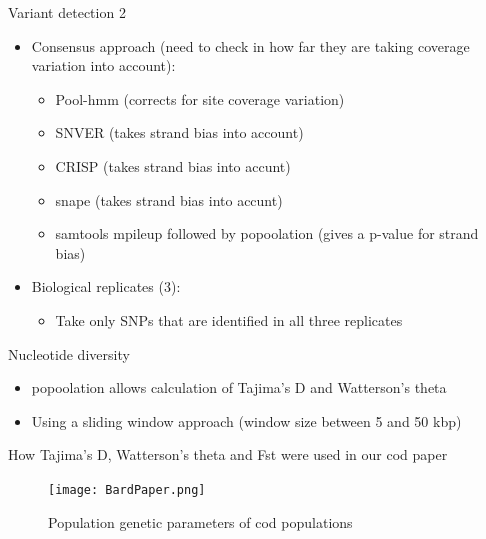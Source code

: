 \documentclass[presentation]{beamer}
\begin{document}
\begin{frame}[label=sec-25]{Variant detection 2}
\begin{itemize}
\item \alert{Consensus approach} (need to check in how far they are taking
coverage variation into account):
\begin{itemize}
\item Pool-hmm (corrects for site coverage variation)
\item SNVER (takes strand bias into account)
\item CRISP (takes strand bias into accunt)
\item snape (takes strand bias into accunt)
\item samtools mpileup followed by popoolation (gives a p-value for
strand bias)
\end{itemize}
\item \alert{Biological replicates (3)}:
\begin{itemize}
\item Take only SNPs that are identified in all three replicates \citep{Robasky2013}
\end{itemize}
\end{itemize}
\end{frame}

\begin{frame}[label=sec-26]{Nucleotide diversity}
\begin{itemize}
\item popoolation allows calculation of Tajima's D and Watterson's theta
\item Using a sliding window approach (window size between 5 and 50 kbp)
\end{itemize}
\end{frame}

\begin{frame}[label=sec-27]{How Tajima's D, Watterson's theta and Fst were used in our cod paper}
\begin{figure}[htb]
\centering
\texttt{[image: BardPaper.png]}
\caption{Population genetic parameters of cod populations}
\end{figure}
\end{frame}
\end{document}

